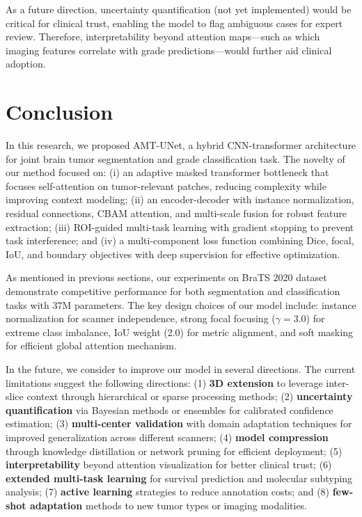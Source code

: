 \documentclass[runningheads]{llncs}
\begin{document}
As a future direction, uncertainty quantification (not yet implemented) would be critical for clinical trust, enabling the model to flag ambiguous cases for expert review. Therefore, interpretability beyond attention maps—such as which imaging features correlate with grade predictions—would further aid clinical adoption.

%
%
\section{Conclusion}

In this research, we proposed AMT-UNet, a hybrid CNN-transformer architecture for joint brain tumor segmentation and grade classification task. The novelty of our method focused on: (i) an adaptive masked transformer bottleneck that focuses self-attention on tumor-relevant patches, reducing complexity while improving context modeling; (ii) an encoder-decoder with instance normalization, residual connections, CBAM attention, and multi-scale fusion for robust feature extraction; (iii) ROI-guided multi-task learning with gradient stopping to prevent task interference; and (iv) a multi-component loss function combining Dice, focal, IoU, and boundary objectives with deep supervision for effective optimization.

As mentioned in previous sections, our experiments on BraTS 2020 dataset demonstrate competitive performance for both segmentation and classification tasks with 37M parameters. The key design choices of our model include: instance normalization for scanner independence, strong focal focusing ($\gamma=3.0$) for extreme class imbalance, IoU weight (2.0) for metric alignment, and soft masking for efficient global attention mechanism.

In the future, we consider to improve our model in several directions. The current limitations suggest the following directions: (1) \textbf{3D extension} to leverage inter-slice context through hierarchical or sparse processing methods; (2) \textbf{uncertainty quantification} via Bayesian methods or ensembles for calibrated confidence estimation; (3) \textbf{multi-center validation} with domain adaptation techniques for improved generalization across different scanners; (4) \textbf{model compression} through knowledge distillation or network pruning for efficient deployment; (5) \textbf{interpretability} beyond attention visualization for better clinical trust; (6) \textbf{extended multi-task learning} for survival prediction and molecular subtyping analysis; (7) \textbf{active learning} strategies to reduce annotation costs; and (8) \textbf{few-shot adaptation} methods to new tumor types or imaging modalities.
\end{document}
